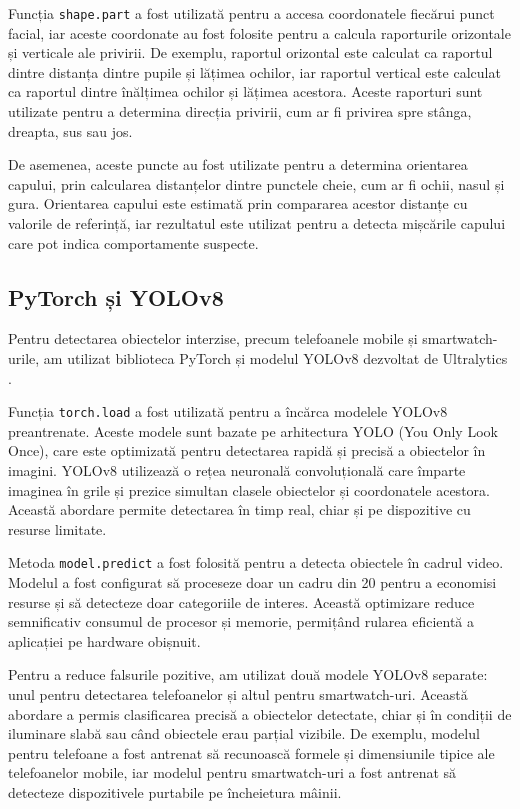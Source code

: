 \documentclass[12pt,a4paper]{article}
\begin{document}
Funcția \texttt{shape.part} a fost utilizată pentru a accesa coordonatele fiecărui punct facial, iar aceste coordonate au fost folosite pentru a calcula raporturile orizontale și verticale ale privirii. De exemplu, raportul orizontal este calculat ca raportul dintre distanța dintre pupile și lățimea ochilor, iar raportul vertical este calculat ca raportul dintre înălțimea ochilor și lățimea acestora. Aceste raporturi sunt utilizate pentru a determina direcția privirii, cum ar fi privirea spre stânga, dreapta, sus sau jos.

De asemenea, aceste puncte au fost utilizate pentru a determina orientarea capului, prin calcularea distanțelor dintre punctele cheie, cum ar fi ochii, nasul și gura. Orientarea capului este estimată prin compararea acestor distanțe cu valorile de referință, iar rezultatul este utilizat pentru a detecta mișcările capului care pot indica comportamente suspecte.

\subsection{PyTorch și YOLOv8}
Pentru detectarea obiectelor interzise, precum telefoanele mobile și smartwatch-urile, am utilizat biblioteca PyTorch \cite{pytorch} și modelul YOLOv8 dezvoltat de Ultralytics \cite{ultralytics}. 

Funcția \texttt{torch.load} a fost utilizată pentru a încărca modelele YOLOv8 preantrenate. Aceste modele sunt bazate pe arhitectura YOLO (You Only Look Once), care este optimizată pentru detectarea rapidă și precisă a obiectelor în imagini. YOLOv8 utilizează o rețea neuronală convoluțională care împarte imaginea în grile și prezice simultan clasele obiectelor și coordonatele acestora. Această abordare permite detectarea în timp real, chiar și pe dispozitive cu resurse limitate.

Metoda \texttt{model.predict} a fost folosită pentru a detecta obiectele în cadrul video. Modelul a fost configurat să proceseze doar un cadru din 20 pentru a economisi resurse și să detecteze doar categoriile de interes. Această optimizare reduce semnificativ consumul de procesor și memorie, permițând rularea eficientă a aplicației pe hardware obișnuit.

Pentru a reduce falsurile pozitive, am utilizat două modele YOLOv8 separate: unul pentru detectarea telefoanelor și altul pentru smartwatch-uri. Această abordare a permis clasificarea precisă a obiectelor detectate, chiar și în condiții de iluminare slabă sau când obiectele erau parțial vizibile. De exemplu, modelul pentru telefoane a fost antrenat să recunoască formele și dimensiunile tipice ale telefoanelor mobile, iar modelul pentru smartwatch-uri a fost antrenat să detecteze dispozitivele purtabile pe încheietura mâinii.
\end{document}
